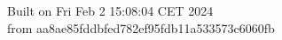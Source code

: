 {\noindent Built on Fri Feb  2 15:08:04 CET 2024} \\ 
 {\noindent from aa8ae85fddbfed782ef95fdb11a533573c6060fb}
